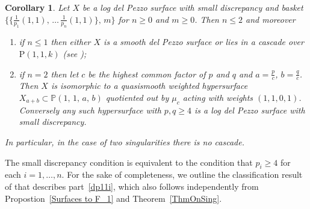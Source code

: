 \documentclass[12pt,a4paper]{book}      %
\newtheorem{cor}[thm]{Corollary}
\theoremstyle{definition}
\newcommand{\mb}[1]{\mathbb{#1}}
\renewcommand{\P}{\mathrm{P}}
\begin{document}
\begin{cor}\label{LengthOne}
Let $X$ be a log del Pezzo surface with small discrepancy and
basket  $\{ \{ \frac{1}{p_1}(1,1), \, \dots \, \frac{1}{p_n}(1,1) \}, \, m \}$
for $n\ge0$ and $m\ge0$. Then $n\le2$ and moreover
\begin{enumerate}
\item\label{dp11i}
if $n\le1$ then either $X$ is a smooth del Pezzo surface or 
lies in a cascade over $\P(1,1,k)$ (see \cite{CP});
\item\label{dp11ii}
if $n=2$ then let $c$ be the highest common factor of $p$ and $q$ and $a = \frac{p}{c}$, $b = \frac{q}{c}$. Then $X$
is isomorphic to a quasismooth weighted hypersurface
$X_{a+b}\subset \mb{P}(1,\,1,\,a,\,b)$ quotiented out by $\mu_c$ acting with weights $(1,1,0,1)$. Conversely any such hypersurface with $p,q\ge4$ is
a log del Pezzo surface with small discrepancy.
\end{enumerate}
In particular, in the case of two singularities there is no cascade.
\end{cor}

The small discrepancy condition is equivalent to the condition that
$p_i \geq 4$ for each $i=1,\dots,n$. 
For the sake of completeness, we outline the classification result of \cite{CP} that
describes part~\ref{dp11i}, which also follows independently from Propostion~\ref{Surfaces to F_1} and Theorem~\ref{ThmOnSing}.
\end{document}
